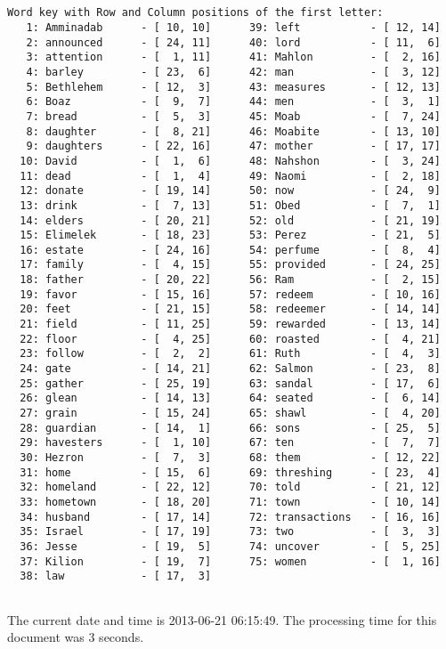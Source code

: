 \documentclass[12pt,a4paper,article]{memoir}\usepackage{graphicx, color}
\begin{document}
\begin{verbatim}


Word key with Row and Column positions of the first letter:
   1: Amminadab      - [ 10, 10]      39: left           - [ 12, 14]
   2: announced      - [ 24, 11]      40: lord           - [ 11,  6]
   3: attention      - [  1, 11]      41: Mahlon         - [  2, 16]
   4: barley         - [ 23,  6]      42: man            - [  3, 12]
   5: Bethlehem      - [ 12,  3]      43: measures       - [ 12, 13]
   6: Boaz           - [  9,  7]      44: men            - [  3,  1]
   7: bread          - [  5,  3]      45: Moab           - [  7, 24]
   8: daughter       - [  8, 21]      46: Moabite        - [ 13, 10]
   9: daughters      - [ 22, 16]      47: mother         - [ 17, 17]
  10: David          - [  1,  6]      48: Nahshon        - [  3, 24]
  11: dead           - [  1,  4]      49: Naomi          - [  2, 18]
  12: donate         - [ 19, 14]      50: now            - [ 24,  9]
  13: drink          - [  7, 13]      51: Obed           - [  7,  1]
  14: elders         - [ 20, 21]      52: old            - [ 21, 19]
  15: Elimelek       - [ 18, 23]      53: Perez          - [ 21,  5]
  16: estate         - [ 24, 16]      54: perfume        - [  8,  4]
  17: family         - [  4, 15]      55: provided       - [ 24, 25]
  18: father         - [ 20, 22]      56: Ram            - [  2, 15]
  19: favor          - [ 15, 16]      57: redeem         - [ 10, 16]
  20: feet           - [ 21, 15]      58: redeemer       - [ 14, 14]
  21: field          - [ 11, 25]      59: rewarded       - [ 13, 14]
  22: floor          - [  4, 25]      60: roasted        - [  4, 21]
  23: follow         - [  2,  2]      61: Ruth           - [  4,  3]
  24: gate           - [ 14, 21]      62: Salmon         - [ 23,  8]
  25: gather         - [ 25, 19]      63: sandal         - [ 17,  6]
  26: glean          - [ 14, 13]      64: seated         - [  6, 14]
  27: grain          - [ 15, 24]      65: shawl          - [  4, 20]
  28: guardian       - [ 14,  1]      66: sons           - [ 25,  5]
  29: havesters      - [  1, 10]      67: ten            - [  7,  7]
  30: Hezron         - [  7,  3]      68: them           - [ 12, 22]
  31: home           - [ 15,  6]      69: threshing      - [ 23,  4]
  32: homeland       - [ 22, 12]      70: told           - [ 21, 12]
  33: hometown       - [ 18, 20]      71: town           - [ 10, 14]
  34: husband        - [ 17, 14]      72: transactions   - [ 16, 16]
  35: Israel         - [ 17, 19]      73: two            - [  3,  3]
  36: Jesse          - [ 19,  5]      74: uncover        - [  5, 25]
  37: Kilion         - [ 19,  7]      75: women          - [  1, 16]
  38: law            - [ 17,  3]


\end{verbatim}


\clearpage
The current date and time is 2013-06-21 06:15:49. The processing time for
this document was 3 seconds.
\end{document}
